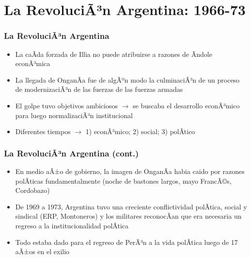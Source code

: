 \documentclass[14pt,aspectratio=169]{beamer}
\begin{document}
         \section{La RevoluciÃ³n Argentina: 1966-73}
      


             \begin{frame}\frametitle{La RevoluciÃ³n Argentina}
                 \begin{itemize}\itemsep 5pt \medskip
                 \item La caÃ­da forzada de Illia no puede atribuirse a
                   razones de Ã­ndole econÃ³mica
                   \item La llegada de OnganÃ­a fue de algÃºn modo la
                     culminaciÃ³n de un proceso de modernizaciÃ³n de las
                     fuerzas de las fuerzas armadas
                     \item El golpe tuvo objetivos ambiciosos
                       $\longrightarrow$ se buscaba el desarrollo
                       econÃ³mico para luego normalizaciÃ³n
                       institucional
                       \item Diferentes tiempos $\longrightarrow$ 1)
                         econÃ³mico; 2) social; 3) polÃ­tico
                   \end{itemize}
               \end{frame}


  \begin{frame}\frametitle{La RevoluciÃ³n Argentina (cont.)}
                 \begin{itemize}\itemsep 5pt \medskip
                 \item En medio aÃ±o de gobierno, la imagen de OnganÃ­a
                   habia caido por razones polÃ­ticas fundamentalmente
                   (noche de bastones largos, mayo FrancÃ©s, Cordobazo)
                   \item De 1969 a 1973, Argentina tuvo una creciente
                     conflictividad polÃ­tica, social y sindical (ERP,
                     Montoneros) y los militares reconocÃ­an que era
                     necesaria un regreso a la institucionalidad
                     polÃ­tica
                     \item Todo estaba dado para el regreso de PerÃ³n a
                       la vida polÃ­tica luego de 17 aÃ±os en el exilio
                   \end{itemize}
               \end{frame}
\end{document}
